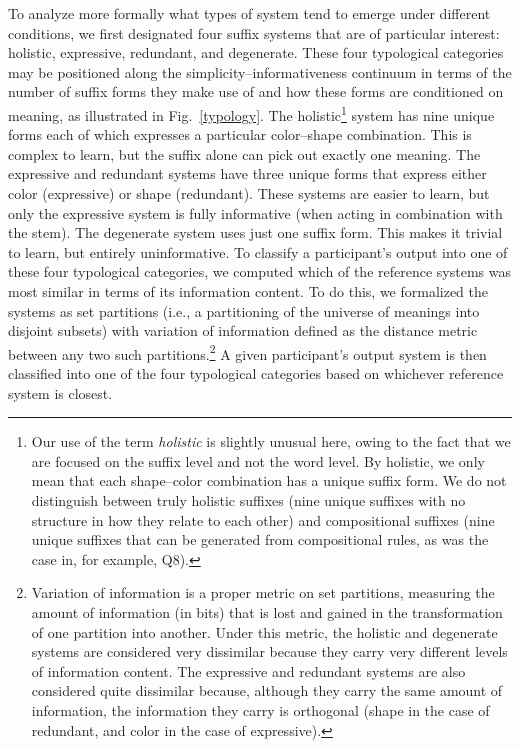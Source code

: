 \documentclass[doc,biblatex]{apa7}
\begin{document}
To analyze more formally what types of system tend to emerge under different conditions, we first designated four suffix systems that are of particular interest: holistic, expressive, redundant, and degenerate. These four typological categories may be positioned along the simplicity--informativeness continuum in terms of the number of suffix forms they make use of and how these forms are conditioned on meaning, as illustrated in Fig.~\ref{typology}. The holistic\footnote{Our use of the term \textit{holistic} is slightly unusual here, owing to the fact that we are focused on the suffix level and not the word level. By holistic, we only mean that each shape--color combination has a unique suffix form. We do not distinguish between truly holistic suffixes (nine unique suffixes with no structure in how they relate to each other) and compositional suffixes (nine unique suffixes that can be generated from compositional rules, as was the case in, for example, Q8).} system has nine unique forms each of which expresses a particular color--shape combination. This is complex to learn, but the suffix alone can pick out exactly one meaning. The expressive and redundant systems have three unique forms that express either color (expressive) or shape (redundant). These systems are easier to learn, but only the expressive system is fully informative (when acting in combination with the stem). The degenerate system uses just one suffix form. This makes it trivial to learn, but entirely uninformative. To classify a participant's output into one of these four typological categories, we computed which of the reference systems was most similar in terms of its information content. To do this, we formalized the systems as set partitions (i.e., a partitioning of the universe of meanings into disjoint subsets) with variation of information \parencite{Meila:2007} defined as the distance metric between any two such partitions.\footnote{Variation of information is a proper metric on set partitions, measuring the amount of information (in bits) that is lost and gained in the transformation of one partition into another. Under this metric, the holistic and degenerate systems are considered very dissimilar because they carry very different levels of information content. The expressive and redundant systems are also considered quite dissimilar because, although they carry the same amount of information, the information they carry is orthogonal (shape in the case of redundant, and color in the case of expressive).} A given participant's output system is then classified into one of the four typological categories based on whichever reference system is closest.
\end{document}
